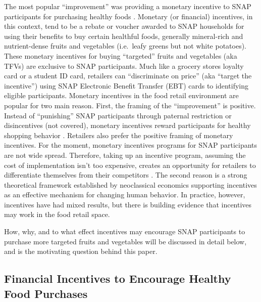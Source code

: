 \documentclass[12pt,letterpaperpaper,]{book}
\begin{document}
The most popular ``improvement'' was providing a monetary incentive to
SNAP participants for purchasing healthy foods
\citep{blumenthal_strategies_2014, leung_qualitative_2013}. Monetary (or
financial) incentives, in this context, tend to be a rebate or voucher
awarded to SNAP households for using their benefits to buy certain
healthful foods, generally mineral-rich and nutrient-dense fruits and
vegetables (i.e.~leafy greens but not white potatoes). These monetary
incentives for buying ``targeted'' fruits and vegetables (aka TFVs) are
exclusive to SNAP participants. Much like a grocery stores loyalty card
or a student ID card, retailers can ``discriminate on price'' (aka
``target the incentive'') using SNAP Electronic Benefit Transfer (EBT)
cards to identifying eligible participants. Monetary incentives in the
food retail environment are popular for two main reason. First, the
framing of the ``improvement'' is positive. Instead of ``punishing''
SNAP participants through paternal restriction or disincentives (not
covered), monetary incentives reward participants for healthy shopping
behavior \citep{gundersen_snap_2015}. Retailers also prefer the positive
framing of monetary incentives. For the moment, monetary incentives
programs for SNAP participants are not wide spread. Therefore, taking up
an incentive program, assuming the cost of implementation isn't too
expensive, creates an opportunity for retailers to differentiate
themselves from their competitors \citep{hartmann_corporate_2011}. The
second reason is a strong theoretical framework established by
neoclassical economics supporting incentives as an effective mechanism
for changing human behavior. In practice, however, incentives have had
mixed results, but there is building evidence that incentives may work
in the food retail space.

How, why, and to what effect incentives may encourage SNAP participants
to purchase more targeted fruits and vegetables will be discussed in
detail below, and is the motivating question behind this paper.

\subsection*{Financial Incentives to Encourage Healthy Food
Purchases}\label{financial-incentives-to-encourage-healthy-food-purchases}
\end{document}
